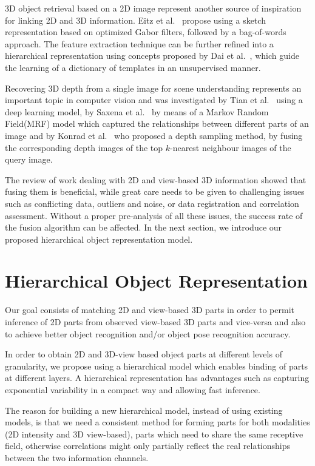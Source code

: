 \documentclass[conference]{IEEEtran}
\begin{document}
3D object retrieval based on a 2D image represent another source of inspiration for linking 2D and 3D information. Eitz et al.~\cite{Eitz2012} propose using a sketch representation based on optimized Gabor filters, followed by a bag-of-words approach. The feature extraction technique can be further refined into a hierarchical representation using concepts proposed by Dai et al.~\cite{Dai2014}, which guide the learning of a dictionary of templates in an unsupervised manner. 

Recovering 3D depth from a single image for scene understanding represents an important topic in computer vision and was investigated by Tian et al.~\cite{Tian2014} using a deep learning model, by Saxena et al.~\cite{Saxena2009} by means of a Markov Random Field(MRF) model which captured the relationships between different parts of an image and by Konrad et al.~\cite{Konrad2012} who proposed a depth sampling method, by fusing the corresponding depth images of the top $k$-nearest neighbour images of the query image.

The review of work dealing with 2D and view-based 3D information showed that fusing them is beneficial, while great care needs to be given to challenging issues such as conflicting data, outliers and noise, or data registration and correlation assessment. Without a proper pre-analysis of all these issues, the success rate of the fusion algorithm can be affected. In the next section, we introduce our proposed hierarchical object representation model.  

\section{Hierarchical Object Representation} 
\label{sec:learning}    

Our goal consists of matching 2D and view-based 3D parts in order to permit inference of 2D parts from observed view-based 3D parts and vice-versa and also to achieve better object recognition and/or object pose recognition accuracy.  

In order to obtain 2D and 3D-view based object parts at different levels of granularity, we propose using a hierarchical model which enables binding of parts at different layers. A hierarchical representation has advantages such as capturing exponential variability in a compact way and allowing fast inference.

The reason for building a new hierarchical model, instead of using existing models, is that we need a consistent method for forming parts for both modalities (2D intensity and 3D view-based), parts which need to share the same receptive field, otherwise correlations might only partially reflect the real relationships between the two information channels.
\end{document}
